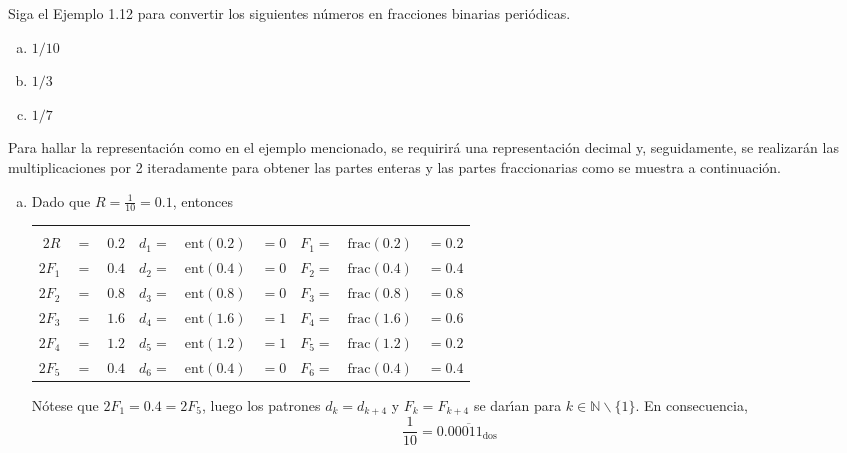 \begin{enunciado}
 Siga el Ejemplo 1.12 para convertir los siguientes n\'umeros en fracciones binarias peri\'odicas.
 \begin{multicols}{3}
  \begin{enumerate}[(a)]
   \item $1/10$
   \item $1/3$
   \item $1/7$
  \end{enumerate}
 \end{multicols}
\end{enunciado}

\begin{solucion}
 Para hallar la representaci\'on como en el ejemplo mencionado, se requirir\'a una representaci\'on decimal y, seguidamente, se realizar\'an las multiplicaciones por 2 iteradamente para obtener las partes enteras y las partes fraccionarias como se muestra a continuaci\'on.
 \begin{enumerate}[(a)]
  \item Dado que $R = \frac{1}{10} = 0.1$, entonces
  \begin{center}
   \begin{tabular}{rclrclrcl}
    & & & \hspace{1.5cm} & & \hspace{1.5cm} \\
    $2R$ & $=$ & $0.2$ & $d_1 =$ & $\text{ent}(0.2)$ & $=0$ & $F_1 =$ & $\text{frac}(0.2)$ & $=0.2$ \\
    $2F_1$ & $=$ & $0.4$ & $d_2 =$ & $\text{ent}(0.4)$ & $=0$ & $F_2 =$ & $\text{frac}(0.4)$ & $=0.4$ \\
    $2F_2$ & $=$ & $0.8$ & $d_3 =$ & $\text{ent}(0.8)$ & $=0$ & $F_3 =$ & $\text{frac}(0.8)$ & $=0.8$ \\
    $2F_3$ & $=$ & $1.6$ & $d_4 =$ & $\text{ent}(1.6)$ & $=1$ & $F_4 =$ & $\text{frac}(1.6)$ & $=0.6$ \\
    $2F_4$ & $=$ & $1.2$ & $d_5 =$ & $\text{ent}(1.2)$ & $=1$ & $F_5 =$ & $\text{frac}(1.2)$ & $=0.2$ \\
    $2F_5$ & $=$ & $0.4$ & $d_6 =$ & $\text{ent}(0.4)$ & $=0$ & $F_6 =$ & $\text{frac}(0.4)$ & $=0.4$ \\
   \end{tabular}
  \end{center}
  N\'otese que $2F_1 = 0.4 = 2F_5$, luego los patrones $d_k = d_{k+4}$ y $F_k = F_{k+4}$ se dar\'{\i}an para $k \in \mathbb{N}\backslash\{ 1 \}$. En consecuencia,
  \begin{equation*}
   \frac{1}{10} = 0.0\overline{0011}_{\text{dos}}
  \end{equation*}


\end{enumerate}
\end{solucion}
